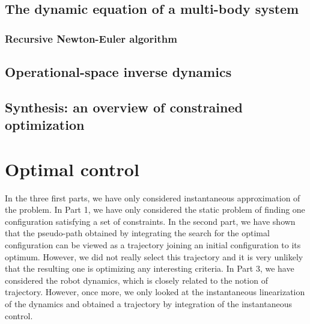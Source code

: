 \documentclass{book}
\begin{document}
\chapter{The dynamic equation of a multi-body system}

\section{Recursive Newton-Euler algorithm}

\chapter{Operational-space inverse dynamics}

\chapter{Synthesis: an overview of constrained optimization}

\part{Optimal control}


In the three first parts, we have only considered instantaneous approximation of the problem. In Part 1, we have only considered the static problem of finding one configuration satisfying a set of constraints. In the second part, we have shown that the pseudo-path obtained by integrating the search for the optimal configuration can be viewed as a trajectory joining an initial configuration to its optimum. However, we did not really select this trajectory and it is very unlikely that the resulting one is optimizing any interesting criteria. In Part 3, we have considered the robot dynamics, which is closely related to the notion of trajectory. However, once more, we only looked at the instantaneous linearization of the dynamics and obtained a trajectory by integration of the instantaneous control. 
\end{document}
